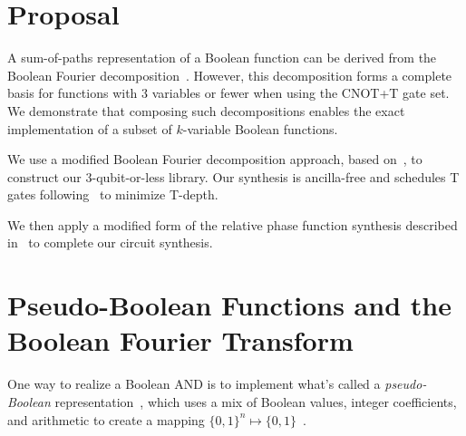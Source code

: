 \section{Proposal}

A sum-of-paths representation of a Boolean function can be derived from the Boolean Fourier decomposition~\cite{odonnell}. However, this decomposition forms a complete basis for functions with 3 variables or fewer when using the CNOT+T gate set. We demonstrate that composing such decompositions enables the exact implementation of a subset of $k$-variable Boolean functions.

We use a modified Boolean Fourier decomposition approach, based on~\cite{amy_duality}, to construct our 3-qubit-or-less library. Our synthesis is ancilla-free and schedules T gates following~\cite{amy2018} to minimize T-depth.

We then apply a modified form of the relative phase function synthesis described in~\cite{amy_relphase} to complete our circuit synthesis.

\section{Pseudo-Boolean Functions and the Boolean Fourier Transform}

One way to realize a Boolean AND is to implement what's called a {\it pseudo-Boolean}
representation~\cite{bib-barenco-elementary,bib-amy-cnot}, which uses a mix of
Boolean values, integer coefficients, and arithmetic to create a mapping $\{0,1\}^n \mapsto \{0,1\}$~\cite{bib-amy-rm}.

